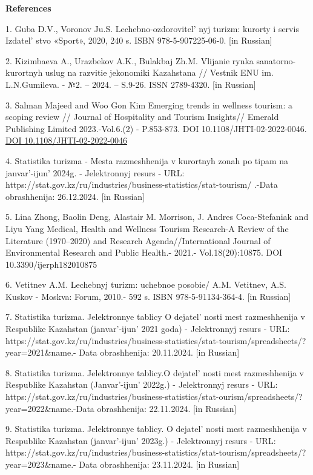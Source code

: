 {\bfseries References}

1. Guba D.V., Voronov Ju.S. Lechebno-ozdorovitel' nyj
turizm: kurorty i servis Izdatel' stvo «Sport», 2020, 240
s. ISBN 978-5-907225-06-0. {[}in Russian{]}

2. Kizimbaeva A., Urazbekov A.K., Bulakbaj Zh.M. Vlijanie rynka
sanatorno-kurortnyh uslug na razvitie jekonomiki Kazahstana // Vestnik
ENU im. L.N.Gumileva. - №2. -- 2024. -- S.9-26. ISSN 2789-4320. {[}in
Russian{]}

3. Salman Majeed and Woo Gon Kim Emerging trends in wellness tourism: a
scoping review // Journal of Hospitality and Tourism Insights// Emerald
Publishing Limited 2023.-Vol.6.(2) - P.853-873. DOI
10.1108/JHTI-02-2022-0046.
\href{https://doi.org/10.1108/JHTI-02-2022-0046}{DOI
10.1108/JHTI-02-2022-0046}

4. Statistika turizma - Mesta razmeshhenija v kurortnyh zonah po tipam
na janvar'-ijun'{} 2024g. - Jelektronnyj
resurs - URL:
https://stat.gov.kz/ru/industries/business-statistics/stat-tourism/
.-Data obrashhenija: 26.12.2024. {[}in Russian{]}

5. Lina Zhong, Baolin Deng, Alastair M. Morrison, J. Andres
Coca-Stefaniak and Liyu Yang Medical, Health and Wellness Tourism
Research-A Review of the Literature (1970--2020) and Research
Agenda//International Journal of Environmental Research and Public
Health.- 2021.- Vol.18(20):10875. DOI 10.3390/ijerph182010875

6. Vetitnev A.M. Lechebnyj turizm: uchebnoe posobie/ A.M. Vetitnev, A.S.
Kuskov - Moskva: Forum, 2010.- 592 s. ISBN 978-5-91134-364-4. {[}in
Russian{]}

7. Statistika turizma. Jelektronnye tablicy O
dejatel' nosti mest razmeshhenija v Respublike Kazahstan
(janvar'-ijun'{} 2021 goda) - Jelektronnyj
resurs - URL:
https://stat.gov.kz/ru/industries/business-statistics/stat-tourism/spreadsheets/?year=2021\&name.-
Data obrashhenija: 20.11.2024. {[}in Russian{]}

8. Statistika turizma. Jelektronnye tablicy.O
dejatel' nosti mest razmeshhenija v Respublike Kazahstan
(Janvar'-ijun'{} 2022g.) - Jelektronnyj
resurs - URL:
https://stat.gov.kz/ru/industries/business-statistics/stat-ourism/spreadsheets/?year=2022\&name.-Data
obrashhenija: 22.11.2024. {[}in Russian{]}

9. Statistika turizma. Jelektronnye tablicy. O
dejatel' nosti mest razmeshhenija v Respublike Kazahstan
(janvar'-ijun'{} 2023g.) - Jelektronnyj
resurs - URL:
https://stat.gov.kz/ru/industries/business-statistics/stat-tourism/spreadsheets/?year=2023\&name.-
Data obrashhenija: 23.11.2024. {[}in Russian{]}

